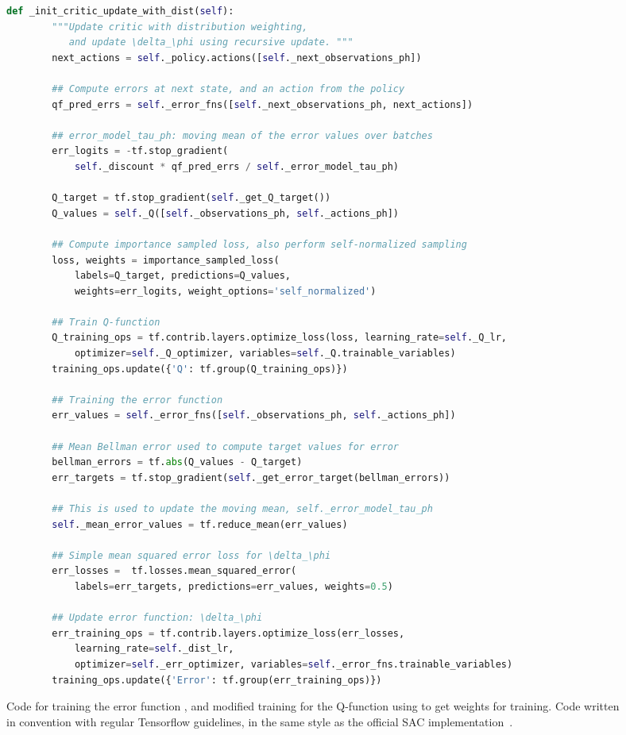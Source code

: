 \documentclass[jmlr]{article}
\begin{document}
\begin{figure*}[t!]
\centering
    \begin{lstlisting}[language=Python]
    def _init_critic_update_with_dist(self):
        """Update critic with distribution weighting, 
           and update \delta_\phi using recursive update. """
        next_actions = self._policy.actions([self._next_observations_ph])
        
        ## Compute errors at next state, and an action from the policy
        qf_pred_errs = self._error_fns([self._next_observations_ph, next_actions])
            
        ## error_model_tau_ph: moving mean of the error values over batches
        err_logits = -tf.stop_gradient(
            self._discount * qf_pred_errs / self._error_model_tau_ph)

        Q_target = tf.stop_gradient(self._get_Q_target())
        Q_values = self._Q([self._observations_ph, self._actions_ph])
        
        ## Compute importance sampled loss, also perform self-normalized sampling
        loss, weights = importance_sampled_loss(
            labels=Q_target, predictions=Q_values,
            weights=err_logits, weight_options='self_normalized')
        
        ## Train Q-function
        Q_training_ops = tf.contrib.layers.optimize_loss(loss, learning_rate=self._Q_lr,
            optimizer=self._Q_optimizer, variables=self._Q.trainable_variables)
        training_ops.update({'Q': tf.group(Q_training_ops)})
        
        ## Training the error function
        err_values = self._error_fns([self._observations_ph, self._actions_ph])
        
        ## Mean Bellman error used to compute target values for error
        bellman_errors = tf.abs(Q_values - Q_target)
        err_targets = tf.stop_gradient(self._get_error_target(bellman_errors))
        
        ## This is used to update the moving mean, self._error_model_tau_ph
        self._mean_error_values = tf.reduce_mean(err_values)

        ## Simple mean squared error loss for \delta_\phi
        err_losses =  tf.losses.mean_squared_error(
            labels=err_targets, predictions=err_values, weights=0.5)
        
        ## Update error function: \delta_\phi
        err_training_ops = tf.contrib.layers.optimize_loss(err_losses,
            learning_rate=self._dist_lr, 
            optimizer=self._err_optimizer, variables=self._error_fns.trainable_variables)
        training_ops.update({'Error': tf.group(err_training_ops)})
    \end{lstlisting}
    \caption{\footnotesize{Code for training the error function , and modified training for the Q-function  using  to get weights  for training. Code written in convention with regular Tensorflow guidelines, in the same style as the official SAC implementation~\citep{haarnoja2018sacapps}.}}
\label{fig:code_discor}
\end{figure*}
\end{document}
